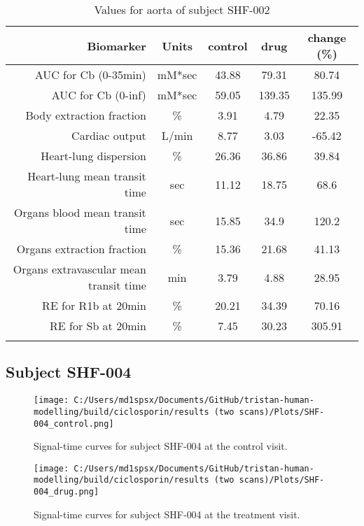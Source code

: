 \documentclass{epflreport}%
\begin{document}
\begin{longtable}{rcccc}%
\hline%
Biomarker&Units&control&drug&change (\%)\\%
\hline%
AUC for Cb (0{-}35min)&mM*sec&43.88&79.31&80.74\\%
AUC for Cb (0{-}inf)&mM*sec&59.05&139.35&135.99\\%
Body extraction fraction&\%&3.91&4.79&22.35\\%
Cardiac output&L/min&8.77&3.03&{-}65.42\\%
Heart{-}lung dispersion&\%&26.36&36.86&39.84\\%
Heart{-}lung mean transit time&sec&11.12&18.75&68.6\\%
Organs blood mean transit time&sec&15.85&34.9&120.2\\%
Organs extraction fraction&\%&15.36&21.68&41.13\\%
Organs extravascular mean transit time&min&3.79&4.88&28.95\\%
RE for R1b at 20min&\%&20.21&34.39&70.16\\%
RE for Sb at 20min&\%&7.45&30.23&305.91\\%
\hline%
\caption{Values for aorta of subject SHF-002} \\%
\end{longtable}%
\clearpage%
\subsection{Subject SHF{-}004}%
\label{subsec:SubjectSHF{-}004}%

%


\begin{figure}[h!]%
\centering%
\texttt{[image: C:/Users/md1spsx/Documents/GitHub/tristan-human-modelling/build/ciclosporin/results (two scans)/Plots/SHF-004\_control.png]}%
\caption{Signal{-}time curves for subject SHF{-}004 at the control visit.}%
\end{figure}

%


\begin{figure}[h!]%
\centering%
\texttt{[image: C:/Users/md1spsx/Documents/GitHub/tristan-human-modelling/build/ciclosporin/results (two scans)/Plots/SHF-004\_drug.png]}%
\caption{Signal{-}time curves for subject SHF{-}004 at the treatment visit.}%
\end{figure}
\end{document}
